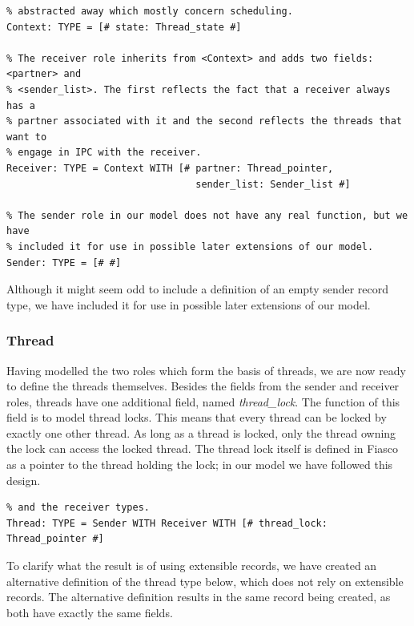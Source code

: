 \lstset{language=PVS}
\begin{lstlisting}[caption={PVS: context, sender and receiver definitions.}]
% The context contains the thread state, here a lot of details have been
% abstracted away which mostly concern scheduling.
Context: TYPE = [# state: Thread_state #]

% The receiver role inherits from <Context> and adds two fields: <partner> and
% <sender_list>. The first reflects the fact that a receiver always has a 
% partner associated with it and the second reflects the threads that want to
% engage in IPC with the receiver.
Receiver: TYPE = Context WITH [# partner: Thread_pointer, 
                                 sender_list: Sender_list #]

% The sender role in our model does not have any real function, but we have
% included it for use in possible later extensions of our model.
Sender: TYPE = [# #]
\end{lstlisting}

Although it might seem odd to include a definition of an empty sender record type, we have included it for use in possible later extensions of our model.

\subsubsection{Thread}
Having modelled the two roles which form the basis of threads, we are now ready to define the threads themselves. Besides the fields from the sender and receiver roles, threads have one additional field, named \emph{thread\_lock}. The function of this field is to model thread locks. This means that every thread can be locked by exactly one other thread. As long as a thread is locked, only the thread owning the lock can access the locked thread. The thread lock itself is defined in Fiasco as a pointer to the thread holding the lock; in our model we have followed this design.

\lstset{language=PVS}
\begin{lstlisting}[caption={PVS: thread definition.}]
% The actual definition of the thread type, which inherits from both the sender
% and the receiver types.
Thread: TYPE = Sender WITH Receiver WITH [# thread_lock: Thread_pointer #]
\end{lstlisting}

To clarify what the result is of using extensible records, we have created an alternative definition of the thread type below, which does not rely on extensible records. The alternative definition results in the same record being created, as both have exactly the same fields.

